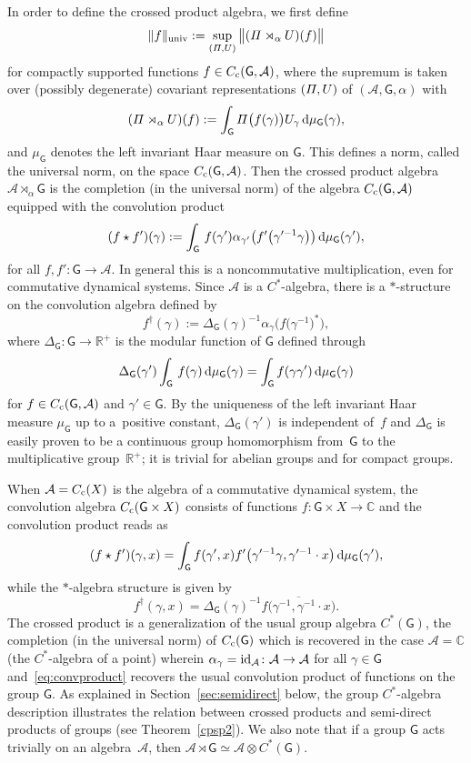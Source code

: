 \documentclass[pdftex]{sigma}
\numberwithin{equation}{section}
\def\dd{{\rm d}}
\newcommand{\sfG}{\mathsf{G}}
\newcommand{\Pim}{{\mit\Pi}}
\newcommand{\complex}{{\mathbb C}} %
\newcommand{\real}{{\mathbb R}} %
\def\alg{{\mathcal A}}
\begin{document}
In order to define the crossed product
algebra, we first define
\[
\|f\|_{\rm univ} := \sup_{({\mit\Pi},U)} \big\|({\mit\Pi}\rtimes_\alpha U)(f)\big\|
\]
for compactly supported functions $f\in C_{\rm c}(\sfG,\alg) $, where the supremum is taken
over (possibly degenerate) covariant representations
$({\mit\Pi},U)$ of $(\alg, \sfG, \alpha)$ with
\[
(\Pim\rtimes_\alpha U)(f) := \int_\sfG
\Pim\big(f(\gamma)\big) U_\gamma\, \dd\mu_\sfG(\gamma) ,
\]
and $\mu_\sfG$ denotes the left invariant Haar measure on $\sfG$. This defines a norm, called the universal norm, on the
space $C_{\rm c}(\sfG,\alg)$.
Then the crossed product algebra $\alg\rtimes_\alpha \sfG$ is the
completion (in the universal norm) of the algebra $C_{\rm c}(\sfG,\alg)$
equipped with the convolution product
\begin{gather}\label{eq:convproduct}
(f\star f')(\gamma) := \int_\sfG\, f(\gamma') \alpha_{\gamma'}\big(f'\big(\gamma'^{-1} \gamma\big)\big)\, \dd \mu_\sfG(\gamma')
,
\end{gather}
for all $f,f'\colon \sfG\to\alg$. In general this is a noncommutative
multiplication, even for commutative dynamical systems.
Since $\alg$ is a $C^*$-algebra, there is a $*$-structure on the
convolution algebra defined by
\[
f^\dag(\gamma):= \Delta_\sfG(\gamma)^{-1} \alpha_\gamma\big(f\big(\gamma^{-1}\big)^*\big) ,
\]
where $\Delta_\sfG\colon \sfG\to \real^+$ is the modular function of
$\sfG$ defined through
\[
\Delta_\sfG(\gamma')
\int_\sfG\,f(\gamma)\,\dd\mu_\sfG(\gamma)=\int_\sfG f(\gamma \gamma')\,\dd\mu_\sfG(\gamma)
\]
for $f\in C_{\rm c}(\sfG,\alg)$ and $\gamma'\in \sfG$. By the uniqueness of the left
invariant Haar measure $\mu_\sfG$ up to a~positive
constant, $\Delta_\sfG(\gamma')$ is independent of~$f$
and $\Delta_\sfG$ is easily proven to be a continuous group homomorphism from~$\sfG$ to the
multiplicative group~$\real^+$; it is trivial for abelian groups and for compact
groups.

When $\alg=C_{\rm c}(X)$
is the algebra of a commutative dynamical system, the convolution
algebra $C_{\rm c}(\sfG\times X)$ consists of functions $f\colon\sfG\times X\to\complex$ and the
convolution product reads as
\[
(f\star f')(\gamma,x) = \int_\sfG f(\gamma',x)
f'\big(\gamma'^{-1} \gamma,\gamma'^{-1}\cdot x\big)\, \dd \mu_\sfG(\gamma') ,
\]
while the $*$-algebra structure is given by
\[
f^\dag(\gamma,x) = \Delta_\sfG(\gamma)^{-1} \overline{f\big(\gamma^{-1},\gamma^{-1}\cdot x\big)} .
\]
The crossed product is a generalization of the usual group algebra
$C^*(\sfG)$, the completion (in the universal norm) of $C_{\rm
 c}(\sfG)$ which is recovered in the case $\alg=\complex$
(the $C^*$-algebra of a point)
wherein $\alpha_\gamma={\rm id}_\alg\colon \alg\to \alg$ for all $\gamma\in \sfG$ and~\eqref{eq:convproduct} recovers the usual convolution product of
functions on the group $\sfG$. As explained in
Section~\ref{sec:semidirect} below, the
group $C^*$-algebra description illustrates the relation between crossed
products and semi-direct products of groups (see Theorem~\ref{cpsp2}). We also
note that if a group $\sfG$ acts trivially on an algebra~$\alg$, then
$\alg\rtimes\sfG\simeq\alg\otimes C^*(\sfG)$.
\end{document}
